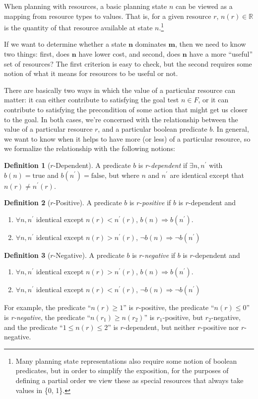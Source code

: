 \documentclass[letterpaper]{article}
\theoremstyle{plain} \newtheorem{theorem}{Theorem} \newtheorem{proposition}{Proposition} \newtheorem{lemma}{Lemma}
\theoremstyle{definition} \newtheorem{definition}{Definition} \newtheorem{conjecture}{Conjecture} \newtheorem*{example}{Example}
\theoremstyle{remark} \newtheorem*{remark}{Remark} \newtheorem*{note}{Note} \newtheorem{case}{Case}
\newcommand{\R}{\mathbb{R}}
\begin{document}
When planning with resources, a basic planning state $n$ can be viewed as a mapping from
resource types to values. That is, for a given resource $r$, $n(r) \in \R$ is the quantity
of that resource available at state $n$.\footnote{Many planning state representations also
require some notion of boolean predicates, but in order to simplify the exposition, for the
purposes of defining a partial order we view these as special resources that always take
values in \{0, 1\}.}

If we want to determine whether a state $\mathbf{n}$ dominates $\mathbf{m}$, then we need
to know two things: first, does $\mathbf{n}$ have lower cost, and second, does $\mathbf{n}$
have a more ``useful'' set of resources? The first criterion is easy to check, but the
second requires some notion of what it means for resources to be useful or not.

There are basically two ways in which the value of a particular resource can matter: it can
either contribute to satisfying the goal test $n \in F$, or it can contribute to satisfying
the precondition of some action that might get us closer to the goal. In both cases, we're
concerned with the relationship between the value of a particular resource $r$, and a
particular boolean predicate $b$. In general, we want to know when it helps to have more (or less) of a particular resource, so we formalize the relationship with the following notions:
\begin{definition}[$r$-Dependent]
A predicate $b$ is $r$-\textit{dependent} if $\exists n, n^\prime$ with $b(n) = \text{true}$ and $b(n^\prime) = \text{false}$, but where $n$ and $n^\prime$ are identical except that $n(r) \ne n^\prime(r)$.
\end{definition}
\begin{definition}[$r$-Positive]
	A predicate $b$ is $r$-\textit{positive} if $b$ is $r$-dependent and
	\begin{enumerate}
		\item $\forall n, n^\prime$ identical except $n(r) < n^\prime(r)$, $b(n) \Rightarrow b(n^\prime).$
		\item $\forall n, n^\prime$ identical except $n(r) > n^\prime(r)$, $\neg b(n) \Rightarrow \neg b(n^\prime)$
	\end{enumerate}
\end{definition}
\begin{definition}[$r$-Negative]
	A predicate $b$ is $r$-\textit{negative} if $b$ is $r$-dependent and
	\begin{enumerate}
		\item $\forall n, n^\prime$ identical except $n(r) > n^\prime(r)$, $b(n) \Rightarrow b(n^\prime).$
		\item $\forall n, n^\prime$ identical except $n(r) < n^\prime(r)$, $\neg b(n) \Rightarrow \neg b(n^\prime)$
	\end{enumerate}
\end{definition}
For example, the predicate ``$n(r) \ge 1$'' is $r$-positive, the predicate ``$n(r) \le 0$'' is \textit{r-negative}, the predicate ``$n(r_1) \ge n(r_2)$'' is $r_1$-positive, but $r_2$-negative, and the predicate ``$1 \le n(r) \le 2$'' is $r$-dependent, but neither $r$-positive nor $r$-negative.
\end{document}
